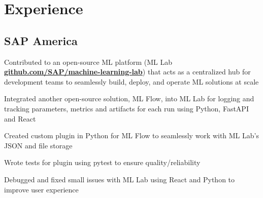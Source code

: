 \documentclass[]{deedy-resume-openfont}
\begin{document}
\begin{minipage}[t]{0.66\textwidth}


    \section{Experience}
    
    \subsection{SAP America}
    \vspace{\topsep} %
    \begin{tightemize}
        \item Contributed to an open-source ML platform (ML Lab \textbf{\href{https://github.com/SAP/machine-learning-lab}{github.com/SAP/machine-learning-lab}}) that acts as a centralized hub for development teams to seamlessly build, deploy, and operate ML solutions at scale
        \item Integrated another open-source solution, ML Flow, into ML Lab for logging and tracking parameters, metrics and artifacts for each run using Python, FastAPI and React
        \item Created custom plugin in Python for ML Flow to seamlessly work with ML Lab's JSON and file storage
        \item Wrote tests for plugin using pytest to ensure quality/reliability
        \item Debugged and fixed small issues with ML Lab using React and Python to improve user experience
    \end{tightemize}
    \sectionsep


\end{minipage}
\end{document}

